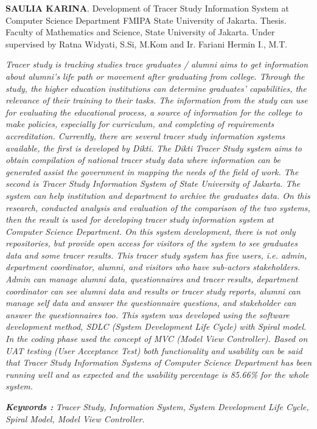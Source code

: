 \documentclass{jtetiskripsi}
\begin{document}
\begin{abstracteng}
\textbf{SAULIA KARINA}. Development of Tracer Study Information System at Computer Science Department FMIPA State University of Jakarta. Thesis. Faculty of Mathematics and Science, State University of Jakarta. Under supervised by Ratna Widyati, S.Si, M.Kom and Ir. Fariani Hermin I., M.T.
\vskip1cm
	
\textit{
Tracer study is tracking studies trace graduates / alumni aims to get information about alumni’s life path or movement after graduating from college. Through the study, the higher education institutions can determine graduates’ capabilities, the relevance of their training to their tasks. The information from the study can use for evaluating the educational process, a source of information for the college to make policies, especially for curriculum, and completing of requirements accreditation. Currently, there are several tracer study information systems available, the first is developed by Dikti. The Dikti Tracer Study system aims to obtain compilation of national tracer study data where information can be generated assist the government in mapping the needs of the field of work. The second is Tracer Study Information System of State University of Jakarta. The system can help institution and department to archive the graduates data. On this research, conducted analysis and evaluation of the comparison of the two systems, then the result is used for developing tracer study information system at Computer Science Department. On this system development, there is not only repositories, but provide open access for visitors of the system to see graduates data and some tracer results. This tracer study system has five users, i.e. admin, department coordinator, alumni, and visitors who have sub-actors stakeholders. Admin can manage alumni data, questionnaires and tracer results, department coordinator can see alumni data and results or tracer study reports, alumni can manage self data and answer the questionnaire questions, and stakeholder can answer the questionnaires too. This system was developed using the software development method, SDLC (System Development Life Cycle) with Spiral model. In the coding phase used the concept of MVC (Model View Controller). Based on UAT testing (User Acceptance Test) both functionality and usability can be said that Tracer Study Information Systems of Computer Science Department has been running well and as expected and the usability percentage is 85.66\% for the whole system. }
    
\bigskip
\noindent
\textbf{\emph{Keywords :}} \emph{Tracer Study, Information System, System Development Life Cycle, Spiral Model, Model View Controller}. 
	
\end{abstracteng}
\end{document}
